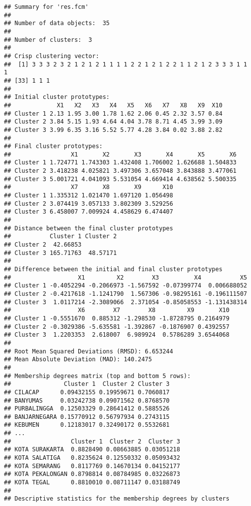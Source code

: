 \documentclass[
]{elegantbook}
\begin{document}
\begin{verbatim}
## Summary for 'res.fcm'
## 
## Number of data objects:  35 
## 
## Number of clusters:  3 
## 
## Crisp clustering vector:
##  [1] 3 3 3 2 3 2 1 2 1 2 1 1 1 1 2 2 1 2 1 2 2 1 1 2 1 2 3 3 3 1 1 1
## [33] 1 1 1
## 
## Initial cluster prototypes:
##             X1   X2   X3   X4   X5   X6   X7   X8   X9  X10
## Cluster 1 2.13 1.95 3.00 1.78 1.62 2.06 0.45 2.32 3.57 0.84
## Cluster 2 3.84 5.15 1.93 4.64 4.04 3.78 8.71 4.45 3.99 3.09
## Cluster 3 3.99 6.35 3.16 5.52 5.77 4.28 3.84 0.02 3.88 2.82
## 
## Final cluster prototypes:
##                 X1       X2       X3       X4       X5       X6
## Cluster 1 1.724771 1.743303 1.432408 1.706002 1.626688 1.504833
## Cluster 2 3.418238 4.025821 3.497306 3.657048 3.843888 3.477061
## Cluster 3 5.001721 4.041093 5.531054 4.669414 4.638562 5.500335
##                 X7       X8       X9      X10
## Cluster 1 1.335312 1.021470 1.697120 1.056498
## Cluster 2 3.074419 3.057133 3.802309 3.529256
## Cluster 3 6.458007 7.009924 4.458629 6.474407
## 
## Distance between the final cluster prototypes
##           Cluster 1 Cluster 2
## Cluster 2  42.66853          
## Cluster 3 165.71763  48.57171
## 
## Difference between the initial and final cluster prototypes
##                   X1         X2        X3          X4           X5
## Cluster 1 -0.4052294 -0.2066973 -1.567592 -0.07399774  0.006688052
## Cluster 2 -0.4217618 -1.1241790  1.567306 -0.98295161 -0.196111507
## Cluster 3  1.0117214 -2.3089066  2.371054 -0.85058553 -1.131438314
##                   X6        X7        X8         X9       X10
## Cluster 1 -0.5551670  0.885312 -1.298530 -1.8728795 0.2164979
## Cluster 2 -0.3029386 -5.635581 -1.392867 -0.1876907 0.4392557
## Cluster 3  1.2203353  2.618007  6.989924  0.5786289 3.6544068
## 
## Root Mean Squared Deviations (RMSD): 6.653244 
## Mean Absolute Deviation (MAD): 140.2475 
## 
## Membership degrees matrix (top and bottom 5 rows): 
##               Cluster 1  Cluster 2 Cluster 3
## CILACAP      0.09432155 0.19959671 0.7060817
## BANYUMAS     0.03242738 0.09071562 0.8768570
## PURBALINGGA  0.12503329 0.28641412 0.5885526
## BANJARNEGARA 0.15770912 0.56797934 0.2743115
## KEBUMEN      0.12183017 0.32490172 0.5532681
## ...
##                 Cluster 1  Cluster 2  Cluster 3
## KOTA SURAKARTA  0.8828490 0.08663885 0.03051218
## KOTA SALATIGA   0.8235624 0.12550332 0.05093432
## KOTA SEMARANG   0.8117769 0.14670134 0.04152177
## KOTA PEKALONGAN 0.8798814 0.08784985 0.03226873
## KOTA TEGAL      0.8810010 0.08711147 0.03188749
## 
## Descriptive statistics for the membership degrees by clusters

\end{verbatim}
\end{document}
